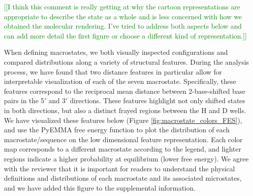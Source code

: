 \documentclass[11pt,a4paper]{letter} %
\newcommand*{\noteg}[1]{\textcolor{green}{[[#1]]}}		%
\begin{document}
\noteg{I think this comment is really getting at why the cartoon representations are appropriate to describe the state as a whole and is less concerned with how we obtained the molecular rendering. I've tried to address both aspects below and can add more detail the first figure or choose a different kind of representation.}

When defining macrostates, we both visually inspected configurations and compared distributions along a variety of structural features.  During the analysis process, we have found that two distance features in particular allow for interpretable visualization of each of the seven macrostate. Specifically, these features correspond to the reciprocal mean distance between 2-base-shifted base pairs in the 5$\prime$ and 3$\prime$ directions. These features highlight not only shifted states in both directions, but also a distinct frayed regions between the H and D wells. We have visualized these features below (Figure \ref{fig:macrostate_colors_FES}), and use the PyEMMA free energy function to plot the distribution of each macrostate/sequence on the low dimensional feature representation. Each color map corresponds to a different macrostate according to the legend, and lighter regions indicate a higher probability at equilibrium (lower free energy). We agree with the reviewer that it is important for readers to understand the physical definitions and distributions of each macrostate and its associated microstates, and we have added this figure to the supplemental information.

\end{document}
